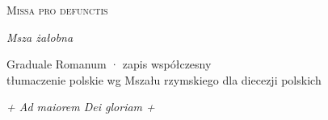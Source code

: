 



\begin{center}
  {\Huge\scshape Missa pro defunctis}\par\smallskip
  {\Large\itshape Msza żałobna}\par\smallskip
  {\small Graduale Romanum · zapis współczesny\\
   tłumaczenie polskie wg Mszału rzymskiego dla diecezji polskich}
\end{center}



\vfill
{\centering\itshape + Ad maiorem Dei gloriam +\par}


